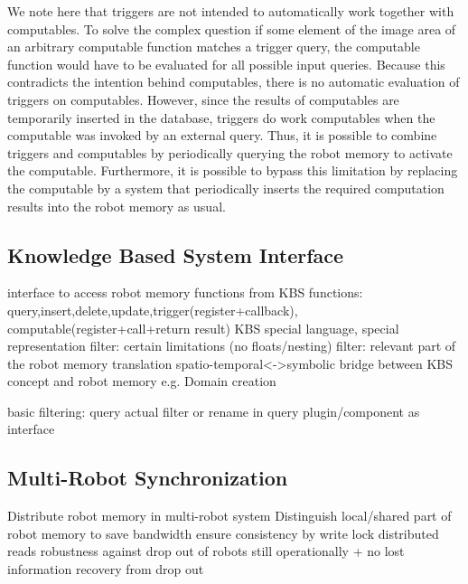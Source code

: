 {We note here that triggers are not intended to automatically work
together with computables. To solve the complex question if
some element of the image area of an arbitrary computable function
matches a trigger query, the computable function would have to be
evaluated for all possible input queries. Because this contradicts the
intention behind computables, there is no automatic evaluation of
triggers on computables. However, since the results of computables
are temporarily inserted in the database, triggers do work computables
when the computable was invoked by an external query. Thus, it is
possible to combine triggers and computables by periodically querying
the robot memory to activate the computable. Furthermore, it is
possible to bypass this limitation by replacing the computable by a
system that periodically inserts the required computation results into
the robot memory as usual.

\subsection{Knowledge Based System Interface}
\label{sec:kbs-interface}

interface to access robot memory functions from KBS
functions: query,insert,delete,update,trigger(register+callback),
  computable(register+call+return result)
KBS special language, special representation
filter: certain limitations (no floats/nesting)
filter: relevant part of the robot memory
translation spatio-temporal<->symbolic
bridge between KBS concept and robot memory
e.g. Domain creation

basic filtering: query
actual filter or rename in query
plugin/component as interface


\subsection{Multi-Robot Synchronization}
\label{sec:synchronization}

Distribute robot memory in multi-robot system
Distinguish local/shared part of robot memory
 to save bandwidth
ensure consistency by write lock
distributed reads
robustness against drop out of robots
  still operationally + no lost information
recovery from drop out

}
